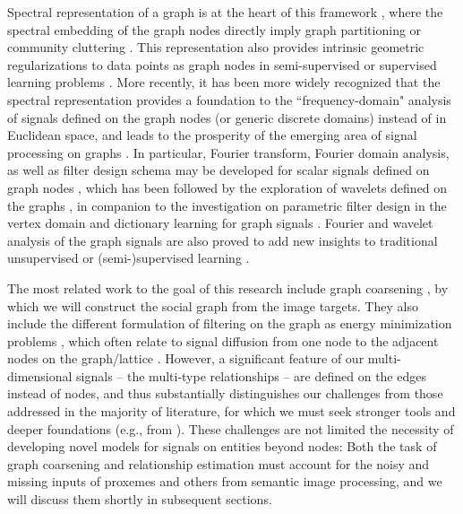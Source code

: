 Spectral representation of a graph is at the heart of this framework \cite{Ng:spectral,Luxburg,zhang2008multiway}, where the spectral embedding of the graph nodes directly imply graph partitioning or community cluttering \cite{PhysRevE,Boykov:segmentation}. This representation also provides intrinsic geometric regularizations to data points as graph nodes in semi-supervised or supervised learning problems \cite{Zhu2005,Smola2003,Zhou04}. More recently, it has been more widely recognized that the spectral representation provides a foundation to the ``frequency-domain" analysis of signals defined on the graph nodes (or generic discrete domains) instead of in Euclidean space, and leads to the prosperity of the emerging area of signal processing on graphs \cite{MouraSurvey,ShumanSurvey}. In particular, Fourier transform, Fourier domain analysis, as well as filter design schema may be developed for scalar signals defined on graph nodes \cite{hammond,Agaskar,Rabbat,shuman_ACHA_2013}, which has been followed by the exploration of wavelets defined on the graphs \cite{CK03,GavishNC10,narang2009lifting,RamEladCohen,NIPS2013_5046,Leonardi,ShumanFV13}, in companion to the investigation on parametric filter design in the vertex domain \cite{SandryhailaFilter,hammond} and dictionary learning for graph signals \cite{ThanouSF14,ZhangDF12}. Fourier and wavelet analysis of the graph signals are also proved to add new insights to traditional unsupervised \cite{Tremblay2014} or (semi-)supervised learning \cite{shuman2011semi,narang2013localized,Ekambaram,sandryhaila2013classification,ChenTSP2014}.

 The most related work to the goal of this research include graph coarsening \cite{LafonPAMI,RonCoarsening}, by which we will construct the social graph from the image targets. They also include the different formulation of filtering on the graph as energy minimization problems \cite{Grady10}, which often relate to signal diffusion from one node to the adjacent nodes on the graph/lattice \cite{Geman_diffusion,Black_diffusion,Perona_diffusion,Bouman_diffusion,Zhangdiffusion}. However, a significant feature of our multi-dimensional signals -- the multi-type relationships -- are defined on the edges instead of nodes, and thus substantially distinguishes our challenges from those addressed in the majority of literature, for which we must seek stronger tools and deeper foundations (e.g., from \cite{Grady10}). These challenges are not limited the necessity of developing novel models for signals on entities beyond nodes: Both the task of graph coarsening and relationship estimation must account for the noisy and missing inputs of proxemes and others from semantic image processing, and we will discuss them shortly in subsequent sections.

